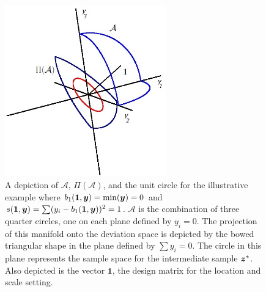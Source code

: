 \documentclass[ba]{imsart}
\newcommand{\by}{\mbox{\boldmath $y$}}
\newcommand{\bz}{\mbox{\boldmath $z$}}
\begin{document}
\begin{figure}[t]
\centering
\includegraphics[width=2.75in]{minSS3dSampleSpace.jpg}
\caption{A depiction of $\mathcal{A}$, $\Pi(\mathcal{A})$, and the
  unit circle for the illustrative example where $b_{1}(\mathbf{1},\by)=\min(\by)=0$ and
  $s(\mathbf{1},\by)=\sum (y_i -b_{1}(\mathbf{1},\by))^2 =1$.
$\mathcal{A}$ is the combination of three quarter circles, one
  on each plane defined by $y_i=0$. The projection of this manifold
  onto the deviation space is depicted by the bowed triangular shape
  in the plane defined by $\sum y_i=0$. The circle in this plane
  represents the sample space for the intermediate sample $\bz^*$. Also
  depicted is the vector $\mathbf{1}$, the design matrix for the
  location and scale setting.}
\label{fig:sampSpace}
\end{figure}

%
\end{document}
